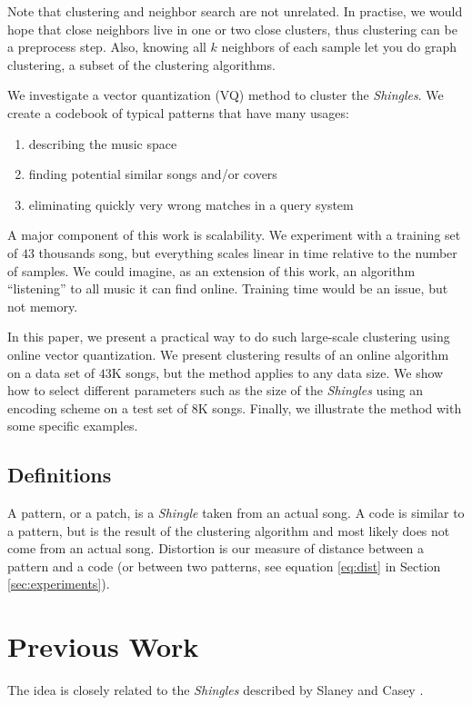 \documentclass{article}
\begin{document}
Note that clustering and neighbor search are not unrelated.
In practise, we would hope that close neighbors live in one or two
close clusters, thus clustering can be a preprocess step. Also,
knowing all $k$ neighbors of each sample let you do graph clustering,
a subset of the clustering algorithms.

We investigate a vector quantization \cite{Datar2004} (VQ) method to
cluster the \textit{Shingles}. We create a codebook of typical patterns
that have many usages:
\begin{enumerate}
\item describing the music space
\item finding potential similar songs and/or covers
\item eliminating quickly very wrong matches in a query system
\end{enumerate}


A major component of this work is scalability. We experiment with a training
set of $43$ thousands song, but everything scales linear in time
relative to the number of samples. We could imagine, as an extension
of this work, an algorithm ``listening'' to all music it can find online.
Training time would be an issue, but not memory.


In this paper, we present a practical way to do such large-scale 
clustering using online vector quantization. We present clustering results 
of an online algorithm on a data set of $43$K songs, but the method applies 
to any data size. We show how to select different parameters such as the size 
of the \textit{Shingles} using an encoding scheme on a test set of $8$K songs. 
Finally, we illustrate the method with some specific examples.



\subsection{Definitions}
A pattern, or a patch, is a \textit{Shingle} taken from an actual song.
A code is similar to a pattern, but is the result of the clustering
algorithm and most likely does not come from an actual song.
Distortion is our measure of distance between a pattern and a code
(or between two patterns, see equation \ref{eq:dist} in Section 
\ref{sec:experiments}).


\section{Previous Work}\label{sec:prevwork}
The idea is closely related to the \textit{Shingles} described by
Slaney and Casey \cite{Casey2006,Casey2007,Casey2008}. 
\end{document}
